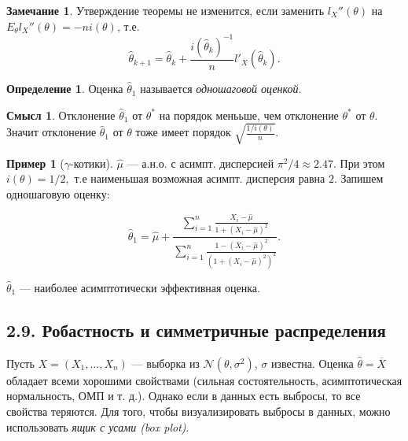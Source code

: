 \documentclass[12pt]{report}
\theoremstyle{definition}
\newtheorem{definition}{Определение}
\newtheorem{example}{Пример}
\newtheorem{sense}{Смысл}
\newtheorem{remark}{Замечание}
\begin{document}
\begin{remark}
	Утверждение теоремы не изменится, если заменить $l_X''(\theta)$ на $E_\theta l_X''(\theta) = -ni(\theta)$, т.е.
	$$  \widehat{\theta}_{k+1} =  \widehat{\theta}_{k} + \dfrac{i(\widehat{\theta}_{k})^{-1}}{n}l'_X(\widehat{\theta}_{k}). $$
\end{remark}
\begin{definition}
	Оценка $\widehat{\theta}_{1}$ называется \emph{одношаговой оценкой}. 
\end{definition}
\begin{sense}
	Отклонение $\widehat{\theta}_1$ от $\theta^*$ на порядок менььше, чем отклонение $\theta^*$ от $\theta$. Значит отклонение $\widehat{\theta}_1$ от $\theta$ тоже имеет порядок $\sqrt{\frac{1/i(\theta)}{n}}$.
\end{sense}
\begin{example}[$\gamma$-котики]
	$\widehat{\mu}$ — а.н.о. с асимпт. дисперсией $\pi^2/4 \approx 2.47$. При этом $i(\theta) = 1/2,$ т.е наименьшая возможная асимпт. дисперсия равна $2$. Запишем одношаговую оценку:

$$ \widehat{\theta}_1 = \widehat{\mu} + \dfrac{\sum\limits_{i=1}^n \frac{X_i - \widehat{\mu}}{1 + (X_i - \widehat{\mu})^2} }{\sum\limits_{i=1}^n  \frac{1 - (X_i - \widehat{\mu})^2}{(1 + (X_i - \widehat{\mu})^2)^2}}. $$

$\widehat{\theta}_1$ — наиболее асимптотически эффективная оценка.
\end{example}

\subsection{2.9. Робастность и симметричные распределения}
Пусть $X = (X_1, \dots, X_n)$ — выборка из $\mathcal{N}(\theta, \sigma^2)$, $\sigma$ известна.  
Оценка $\widehat{\theta} = \overline{X}$ обладает всеми хорошими свойствами (сильная состоятельность, асимптотическая нормальность, ОМП и т. д.). Однако если в данных есть выбросы, то все свойства теряются.  
Для того, чтобы визуализировать выбросы в данных, можно использовать \emph{ящик с усами (box plot)}.
\end{document}
